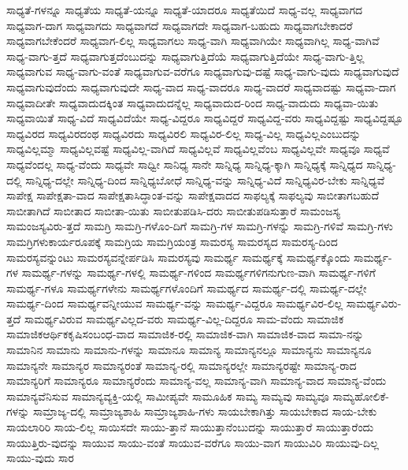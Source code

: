 {ಸಾಧ್ಯತೆ-ಗಳನ್ನೂ
ಸಾಧ್ಯತೆಯ
ಸಾಧ್ಯತೆ-ಯನ್ನೂ
ಸಾಧ್ಯತೆ-ಯಾದರೂ
ಸಾಧ್ಯತೆಯಿದೆ
ಸಾಧ್ಯ-ವಲ್ಲ
ಸಾಧ್ಯವಾಗದ
ಸಾಧ್ಯವಾಗ-ದಾಗ
ಸಾಧ್ಯವಾಗದು
ಸಾಧ್ಯವಾಗದೆ
ಸಾಧ್ಯವಾಗದೇ
ಸಾಧ್ಯವಾಗ-ಬಹುದು
ಸಾಧ್ಯವಾಗಬೇಕಾದರೆ
ಸಾಧ್ಯವಾಗಬೇಕೆಂದರೆ
ಸಾಧ್ಯವಾಗ-ಲಿಲ್ಲ
ಸಾಧ್ಯವಾಗಲು
ಸಾಧ್ಯ-ವಾಗಿ
ಸಾಧ್ಯವಾಗಿಯೇ
ಸಾಧ್ಯವಾಗಿಲ್ಲ
ಸಾಧ್ಯ-ವಾಗಿವೆ
ಸಾಧ್ಯ-ವಾಗು-ತ್ತದೆ
ಸಾಧ್ಯವಾಗುತ್ತದೆಂಬುದನ್ನು
ಸಾಧ್ಯವಾಗುತ್ತಿದೆಯೆ
ಸಾಧ್ಯವಾಗುತ್ತಿದೆಯೇ
ಸಾಧ್ಯ-ವಾಗು-ತ್ತಿಲ್ಲ
ಸಾಧ್ಯವಾಗುವ
ಸಾಧ್ಯ-ವಾಗು-ವಂತೆ
ಸಾಧ್ಯವಾಗುವ-ವರೆಗೂ
ಸಾಧ್ಯವಾಗುವು-ದಷ್ಟೆ
ಸಾಧ್ಯ-ವಾಗು-ವುದು
ಸಾಧ್ಯವಾಗುವುದೆ
ಸಾಧ್ಯವಾಗುವುದೆಂದು
ಸಾಧ್ಯವಾಗುವುದೇ
ಸಾಧ್ಯ-ವಾದ
ಸಾಧ್ಯ-ವಾದರೂ
ಸಾಧ್ಯ-ವಾದರೆ
ಸಾಧ್ಯವಾದಷ್ಟು
ಸಾಧ್ಯವಾ-ದಾಗ
ಸಾಧ್ಯವಾದೀತೇ
ಸಾಧ್ಯವಾದುದಕ್ಕಿಂತ
ಸಾಧ್ಯವಾದುದನ್ನೆಲ್ಲ
ಸಾಧ್ಯವಾದುದ-ರಿಂದ
ಸಾಧ್ಯ-ವಾದುದು
ಸಾಧ್ಯವಾ-ಯಿತು
ಸಾಧ್ಯವಾಯಿತೆ
ಸಾಧ್ಯ-ವಿದೆ
ಸಾಧ್ಯವಿದೆಯೇ
ಸಾಧ್ಯ-ವಿದ್ದರೂ
ಸಾಧ್ಯವಿದ್ದರೆ
ಸಾಧ್ಯವಿದ್ದ-ವರು
ಸಾಧ್ಯವಿದ್ದಷ್ಟು
ಸಾಧ್ಯವಿದ್ದಷ್ಟೂ
ಸಾಧ್ಯವಿರದ
ಸಾಧ್ಯವಿರದಂಥ
ಸಾಧ್ಯವಿರದು
ಸಾಧ್ಯವಿರಲಿ
ಸಾಧ್ಯವಿರ-ಲಿಲ್ಲ
ಸಾಧ್ಯ-ವಿಲ್ಲ
ಸಾಧ್ಯವಿಲ್ಲಎಂಬುದನ್ನು
ಸಾಧ್ಯವಿಲ್ಲಮ್ಮಾ
ಸಾಧ್ಯವಿಲ್ಲವಷ್ಟೆ
ಸಾಧ್ಯವಿಲ್ಲ-ವಾಗಿದೆ
ಸಾಧ್ಯವಿಲ್ಲವೆ
ಸಾಧ್ಯವಿಲ್ಲವೆಂಬ
ಸಾಧ್ಯವಿಲ್ಲವೇ
ಸಾಧ್ಯವೂ
ಸಾಧ್ಯವೆ
ಸಾಧ್ಯವೆಂದಲ್ಲ
ಸಾಧ್ಯ-ವೆಂದು
ಸಾಧ್ಯವೇ
ಸಾಧ್ವೀ
ಸಾನಿಧ್ಯ
ಸಾನೇ
ಸಾನ್ನಿಧ್ಯ
ಸಾನ್ನಿಧ್ಯ-ಕ್ಕಾಗಿ
ಸಾನ್ನಿಧ್ಯಕ್ಕೆ
ಸಾನ್ನಿಧ್ಯದ
ಸಾನ್ನಿಧ್ಯ-ದಲ್ಲಿ
ಸಾನ್ನಿಧ್ಯ-ದಲ್ಲೇ
ಸಾನ್ನಿಧ್ಯ-ದಿಂದ
ಸಾನ್ನಿಧ್ಯಬೋಧೆ
ಸಾನ್ನಿಧ್ಯ-ವನ್ನು
ಸಾನ್ನಿಧ್ಯ-ವಿದೆ
ಸಾನ್ನಿಧ್ಯವಿರ-ಬೇಕು
ಸಾನ್ನಿಧ್ಯವೆ
ಸಾಪೇಕ್ಷ
ಸಾಪೇಕ್ಷತಾ-ವಾದ
ಸಾಪೇಕ್ಷತಾಸಿದ್ಧಾಂತ-ವನ್ನು
ಸಾಪೇಕ್ಷವಾದದ
ಸಾಫಲ್ಯಕ್ಕೆ
ಸಾಫಲ್ಯವು
ಸಾಬೀತಾಗಬಹುದೆ
ಸಾಬೀತಾಗಿದೆ
ಸಾಬೀತಾದ
ಸಾಬೀತಾ-ಯಿತು
ಸಾಬೀತುಪಡಿಸಿ-ದರು
ಸಾಬೀತುಪಡಿಸುತ್ತಾರೆ
ಸಾಮಂಜಸ್ಯ
ಸಾಮಂಜಸ್ಯವಿರು-ತ್ತದೆ
ಸಾಮಗ್ರಿ
ಸಾಮಗ್ರಿ-ಗಳೊಂ-ದಿಗೆ
ಸಾಮಗ್ರಿ-ಗಳ
ಸಾಮಗ್ರಿ-ಗಳನ್ನು
ಸಾಮಗ್ರಿ-ಗಳಿವೆ
ಸಾಮಗ್ರಿ-ಗಳು
ಸಾಮಗ್ರಿಗಳುಕಾರ್ಯರೂಪಕ್ಕೆ
ಸಾಮಗ್ರಿಯ
ಸಾಮಗ್ರಿಯಂತ್ರ
ಸಾಮರಸ್ಯ
ಸಾಮರಸ್ಯದ
ಸಾಮರಸ್ಯ-ದಿಂದ
ಸಾಮರಸ್ಯವನ್ನುಂಟು
ಸಾಮರಸ್ಯವನ್ನೇರ್ಪಡಿಸಿ
ಸಾಮರಸ್ಯವು
ಸಾಮರ್ಥ್ಯ
ಸಾಮರ್ಥ್ಯಕ್ಕೆ
ಸಾಮರ್ಥ್ಯಕ್ಕೊಂದು
ಸಾಮರ್ಥ್ಯ-ಗಳ
ಸಾಮರ್ಥ್ಯ-ಗಳನ್ನು
ಸಾಮರ್ಥ್ಯ-ಗಳಲ್ಲಿ
ಸಾಮರ್ಥ್ಯ-ಗಳಿಂದ
ಸಾಮರ್ಥ್ಯಗಳಿಗನುಗುಣ-ವಾಗಿ
ಸಾಮರ್ಥ್ಯ-ಗಳಿಗೆ
ಸಾಮರ್ಥ್ಯ-ಗಳೂ
ಸಾಮರ್ಥ್ಯಗಳೇನು
ಸಾಮರ್ಥ್ಯಗಳೊಂದಿಗೆ
ಸಾಮರ್ಥ್ಯದ
ಸಾಮರ್ಥ್ಯ-ದಲ್ಲಿ
ಸಾಮರ್ಥ್ಯ-ದಲ್ಲೇ
ಸಾಮರ್ಥ್ಯ-ದಿಂದ
ಸಾಮರ್ಥ್ಯವನ್ನೀಯುವ
ಸಾಮರ್ಥ್ಯ-ವನ್ನು
ಸಾಮರ್ಥ್ಯ-ವಿದ್ದರೂ
ಸಾಮರ್ಥ್ಯವಿರ-ಲಿಲ್ಲ
ಸಾಮರ್ಥ್ಯವಿರು-ತ್ತದೆ
ಸಾಮರ್ಥ್ಯವಿರುವ
ಸಾಮರ್ಥ್ಯವಿಲ್ಲದ-ವರು
ಸಾಮರ್ಥ್ಯ-ವಿಲ್ಲ-ದಿದ್ದರೂ
ಸಾಮ-ವೆಂದು
ಸಾಮಾಜಿಕ
ಸಾಮಾಜಿಕಆರ್ಥಿಕಕೃಷಿಸಂಬಂಧ-ವಾದ
ಸಾಮಾಜಿಕ-ರಲ್ಲಿ
ಸಾಮಾಜಿಕ-ವಾಗಿ
ಸಾಮಾಜಿಕ-ವಾದ
ಸಾಮಾ-ನನ್ನು
ಸಾಮಾನಿನ
ಸಾಮಾನು
ಸಾಮಾನು-ಗಳನ್ನು
ಸಾಮಾನೂ
ಸಾಮಾನ್ಯ
ಸಾಮಾನ್ಯನಲ್ಲೂ
ಸಾಮಾನ್ಯನು
ಸಾಮಾನ್ಯನೂ
ಸಾಮಾನ್ಯನೇ
ಸಾಮಾನ್ಯರ
ಸಾಮಾನ್ಯರಂತೆ
ಸಾಮಾನ್ಯ-ರಲ್ಲಿ
ಸಾಮಾನ್ಯರಲ್ಲೇ
ಸಾಮಾನ್ಯರಷ್ಟೇ
ಸಾಮಾನ್ಯ-ರಾದ
ಸಾಮಾನ್ಯರಿಗೆ
ಸಾಮಾನ್ಯರೂ
ಸಾಮಾನ್ಯರೆಂದು
ಸಾಮಾನ್ಯ-ವಲ್ಲ
ಸಾಮಾನ್ಯ-ವಾಗಿ
ಸಾಮಾನ್ಯ-ವಾದ
ಸಾಮಾನ್ಯ-ವೆಂದು
ಸಾಮಾನ್ಯವೆನಿಸುವ
ಸಾಮಾನ್ಯವ್ಯಕ್ತಿ-ಯಲ್ಲಿ
ಸಾಮೀಪ್ಯವೇ
ಸಾಮೂಹಿಕ
ಸಾಮ್ಯ
ಸಾಮ್ಯವು
ಸಾಮ್ಯವೂ
ಸಾಮ್ಯಹೋಲಿಕೆ-ಗಳನ್ನು
ಸಾಮ್ರಾಜ್ಯ-ದಲ್ಲಿ
ಸಾಮ್ರಾಜ್ಯಶಾಹಿ
ಸಾಮ್ರಾಜ್ಯಶಾಹಿ-ಗಳು
ಸಾಯಬೇಕಾಗಿತ್ತು
ಸಾಯಬೇಕಾದ
ಸಾಯ-ಬೇಕು
ಸಾಯಲಾರಿರಿ
ಸಾಯ-ಲಿಲ್ಲ
ಸಾಯಿಸದೇ
ಸಾಯು-ತ್ತಾನೆ
ಸಾಯುತ್ತಾನೆಂಬುದನ್ನು
ಸಾಯುತ್ತಾರೆ
ಸಾಯುತ್ತಾರೆಂದು
ಸಾಯುತ್ತಿರು-ವುದನ್ನು
ಸಾಯುವ
ಸಾಯು-ವಂತೆ
ಸಾಯುವ-ವರೆಗೂ
ಸಾಯು-ವಾಗ
ಸಾಯುವಿರಿ
ಸಾಯುವು-ದಿಲ್ಲ
ಸಾಯು-ವುದು
ಸಾರ
}
